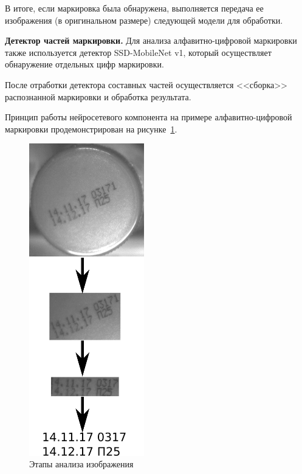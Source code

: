 В итоге, если маркировка была обнаружена, выполняется передача ее изображения (в оригинальном размере) следующей модели для обработки.


\textbf{Детектор частей маркировки.} Для анализа алфавитно-цифровой маркировки также используется детектор SSD-MobileNet v1, который осуществляет обнаружение отдельных цифр маркировки.

После отработки детектора составных частей осуществляется <<сборка>> распознанной маркировки и обработка результата.

Принцип работы нейросетевого компонента на примере алфавитно-цифровой маркировки продемонстрирован на рисунке~\ref{fig:system_work}.

\begin{figure}[!ht]
	\centering
	\includegraphics[width=5cm]{man-source/images/ch4/pic4-5.png}
	\caption{Этапы анализа изображения}
	\label{fig:system_work}
\end{figure}

